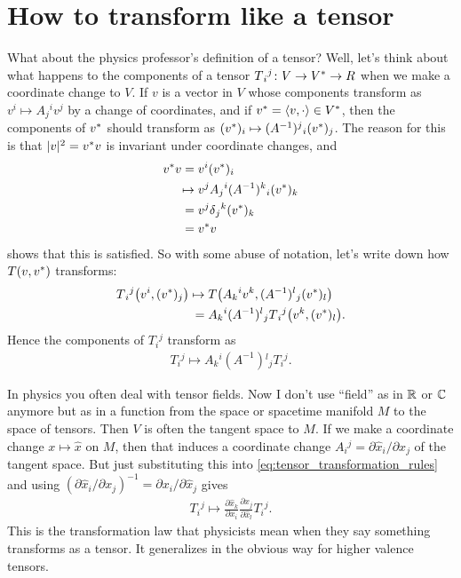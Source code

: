\documentclass[english, 12pt]{article}
\begin{document}
\section{How to transform like a tensor}%
\label{sec:how_to_transform_like_a_tensor}

What about the physics professor's definition of a tensor?
Well, let's think about what happens to the components of a tensor \(T{}_i{}^j \colon V \to {V}^{*} \to R\) when we make a coordinate change to \(V\).
If \(v\) is a vector in \(V\) whose components transform as \(v{}^i \mapsto A{}_j{}^i v{}^j\) by a change of coordinates, and if \({v}^{*} = \langle v, \cdot \rangle \in {V}^{*}\), then the components of \({v}^{*}\) should transform as \(({v}^{*})_i \mapsto (A^{-1}){}^j{}_i ({v}^{*}){}_j\).
The reason for this is that \(|v|^2 = {v}^{*} v\) is invariant under coordinate changes, and
\begin{align*}
	{v}^{*} v ={}& v{}^i ({v}^{*}){}_i\\
	\mapsto{}& v{}^j A{}_j{}^i (A^{-1}){}^k{}_i ({v}^{*}){}_k\\
	={}& v{}^j \delta{}_j{}^k ({v}^{*}){}_k\\
	={}& {v}^{*} v
\end{align*}
shows that this is satisfied.
So with some abuse of notation, let's write down how \(T(v, {v}^{*})\) transforms:
\begin{align*}
	T{}_i{}^j\big(
		v{}^i,
		({v}^{*}){}_j
	\big)
	\mapsto{}& T\big(
		A{}_k{}^i v{}^k,
		(A^{-1}){}^l{}_j ({v}^{*}){}_l
	\big)\\
	={}& A{}_k{}^i (A^{-1}){}^l{}_j T{}_i{}^j
	\big(
		v{}^k,
		({v}^{*}){}_l
	\big).
\end{align*}
Hence the components of \(T{}_i{}^j\) transform as
\begin{align}\label{eq:tensor_transformation_rules}
	T{}_i{}^j \mapsto A{}_k{}^i (A^{-1}){}^l{}_j T{}_i{}^j.
\end{align}

In physics you often deal with tensor fields.
Now I don't use \enquote{field} as in \(\mathbb{R}\) or \(\mathbb{C}\) anymore but as in a function from the space or spacetime manifold \(M\) to the space of tensors.
Then \(V\) is often the tangent space to \(M\).
If we make a coordinate change \(x \mapsto \hat x\) on \(M\), then that induces a coordinate change \(A{}_i{}^j = \partial \hat x_i / \partial x_j\) of the tangent space.
But just substituting this into \cref{eq:tensor_transformation_rules} and using \(\left(\partial \hat x_i / \partial x_j\right)^{-1} = \partial x_i / \partial \hat x_j \) gives
\begin{align*}
	T{}_i{}^j \mapsto \frac{\partial \hat x_k}{\partial x_i} \frac{\partial x_j}{\partial \hat x_l} T{}_i{}^j.
\end{align*}
This is the transformation law that physicists mean when they say something transforms as a tensor.
It generalizes in the obvious way for higher valence tensors.
\end{document}
